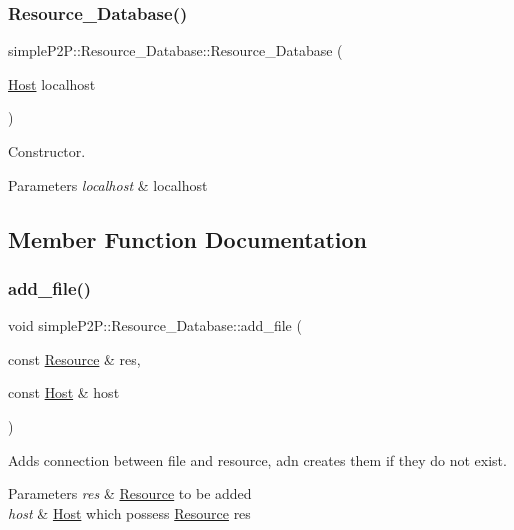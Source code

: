 \subsubsection{\texorpdfstring{Resource\+\_\+\+Database()}{Resource\_Database()}}
{\footnotesize\ttfamily simple\+P2\+P\+::\+Resource\+\_\+\+Database\+::\+Resource\+\_\+\+Database (\begin{DoxyParamCaption}\item[{\hyperlink{classsimpleP2P_1_1Host}{Host}}]{localhost }\end{DoxyParamCaption})}



Constructor. 


\begin{DoxyParams}{Parameters}
{\em localhost} & localhost \\
\hline
\end{DoxyParams}


\subsection{Member Function Documentation}
\mbox{\label{classsimpleP2P_1_1Resource__Database_a7afdd297b15fb225b61f9d52e2ab9cc6}} 
\subsubsection{\texorpdfstring{add\+\_\+file()}{add\_file()}\hspace{0.1cm}{\footnotesize\ttfamily [1/2]}}
{\footnotesize\ttfamily void simple\+P2\+P\+::\+Resource\+\_\+\+Database\+::add\+\_\+file (\begin{DoxyParamCaption}\item[{const \hyperlink{classsimpleP2P_1_1Resource}{Resource} \&}]{res,  }\item[{const \hyperlink{classsimpleP2P_1_1Host}{Host} \&}]{host }\end{DoxyParamCaption})}



Adds connection between file and resource, adn creates them if they do not exist. 


\begin{DoxyParams}{Parameters}
{\em res} & \hyperlink{classsimpleP2P_1_1Resource}{Resource} to be added \\
\hline
{\em host} & \hyperlink{classsimpleP2P_1_1Host}{Host} which possess \hyperlink{classsimpleP2P_1_1Resource}{Resource} res \\
\hline
\end{DoxyParams}
\mbox{\label{classsimpleP2P_1_1Resource__Database_a8ac7f42f7de6f3281974d2be7f1ea8e8}} 

